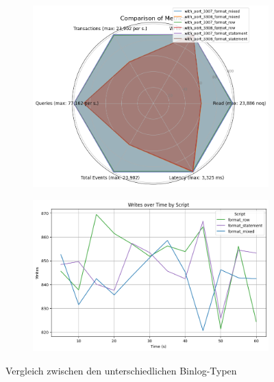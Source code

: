 \begin{figure}[H]
  \centering
  \begin{subfigure}[t]{0.48\textwidth}
    \includegraphics[width=\textwidth]{PNGs/Script/Replication/replication-format-change/statistics}
  \end{subfigure}
  \hfill
  \begin{subfigure}[t]{0.48\textwidth}
    \includegraphics[width=\textwidth]{PNGs/Script/Replication/replication-format-change/Writes}
  \end{subfigure}
  \vspace{-8pt}
  \caption[Replikation: Unterschiedliche Binlog-Typen]{Vergleich zwischen den unterschiedlichen Binlog-Typen }
  \label{fig:replication-format-change}
\end{figure}
\vspace{-20pt}

